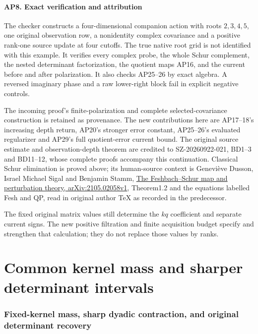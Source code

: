 \documentclass[11pt]{article}
\begin{document}
\subsection{AP8. Exact verification and attribution}\label{ap8.-exact-verification-and-attribution}

The checker constructs a four-dimensional companion action with roots \(2,3,4,5\), one original observation row, a nonidentity complex covariance and a positive rank-one source update at four cutoffs. The true native root grid is not identified with this example. It verifies every complex probe, the whole Schur complement, the nested determinant factorization, the quotient maps AP16, and the current before and after polarization. It also checks AP25--26 by exact algebra. A reversed imaginary phase and a raw lower-right block fail in explicit negative controls.

The incoming proof's finite-polarization and complete selected-covariance construction is retained as provenance. The new contributions here are AP17--18's increasing depth return, AP20's stronger error constant, AP25--26's evaluated regularizer and AP29's full quotient-error current bound. The original source estimate and observation-depth theorem are credited to SZ-20260922-021, BD1--3 and BD11--12, whose complete proofs accompany this continuation. Classical Schur elimination is proved above; its human-source context is Geneviève Dusson, Israel Michael Sigal and Benjamin Stamm, \href{https://arxiv.org/abs/2105.02058v1}{The Feshbach--Schur map and perturbation theory, arXiv:2105.02058v1}, Theorem1.2 and the equations labelled Fesh and QP, read in original author TeX as recorded in the predecessor.

The fixed original matrix values still determine the \(kq\) coefficient and separate current signs. The new positive filtration and finite acquisition budget specify and strengthen that calculation; they do not replace those values by ranks.

\clearpage\part{Common kernel mass and sharper determinant intervals}
\section{Fixed-kernel mass, sharp dyadic contraction, and original determinant recovery}\label{fixed-kernel-mass-sharp-dyadic-contraction-and-original-determinant-recovery}
\end{document}
